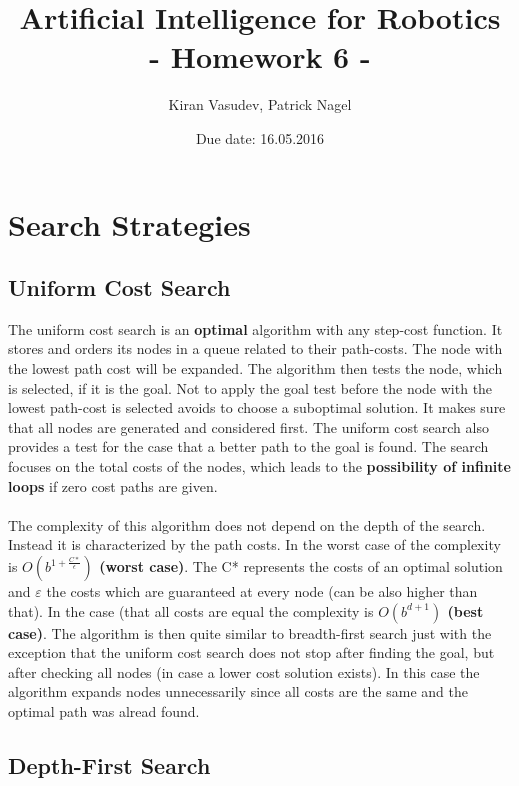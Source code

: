 \documentclass[11pt]{article}
\title{\textbf{Artificial Intelligence for Robotics\\ - Homework 6 -}}
\author{Kiran Vasudev, Patrick Nagel}
\date{Due date: 16.05.2016}
\begin{document}
\maketitle

\newpage
\tableofcontents


\newpage
\section{Search Strategies}
\subsection{Uniform Cost Search}
The uniform cost search is an \textbf{optimal} algorithm with any step-cost function. It stores and orders its nodes in a queue related to their path-costs. The node with the lowest path cost will be expanded. The algorithm then tests the node, which is selected, if it is the goal. Not to apply the goal test before the node with the lowest path-cost is selected avoids to choose a suboptimal solution. It makes sure that all nodes are generated and considered first. The uniform cost search also provides a test for the case that a better path to the goal is found. The  search focuses on the total costs of the nodes, which leads to the \textbf{possibility of infinite loops} if zero cost paths are given.\\
\\
The complexity of this algorithm does not depend on the depth of the search. Instead it is characterized by the path costs. In the worst case of the complexity is \textbf{$O(b^{1 + \frac{C*}{\epsilon}})$ (worst case)}. The C* represents the costs of an optimal solution and $\varepsilon$ the costs which are guaranteed at every node (can be also higher than that). In the case (that all costs are equal the complexity is \textbf{$O(b^{d + 1})$ (best case)}. The algorithm is then quite similar to breadth-first search just with the exception that the uniform cost search does not stop after finding the goal, but after checking all nodes (in case a lower cost solution exists). In this case the algorithm expands nodes unnecessarily since all costs are the same and the optimal path was alread found.


\subsection{Depth-First Search}
\end{document}
